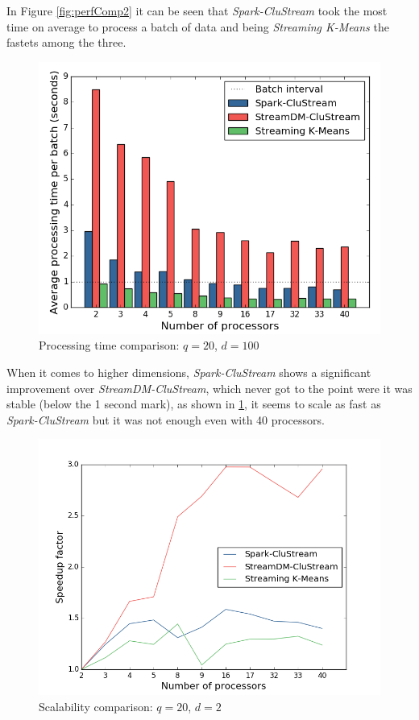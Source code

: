 In Figure \ref{fig:perfComp2} it can be seen that \textit{Spark-CluStream} took the most time on average to process a batch of data and being \textit{Streaming K-Means} the fastets among the three. 

\begin{figure}[h!]
 \centering
 \includegraphics[scale=0.45]{./styles/perfComp100.png}
 \caption{Processing time comparison: $q=20$, $d=100$}
 \label{fig:perfComp100}
\end{figure}

When it comes to higher dimensions, \textit{Spark-CluStream} shows a significant improvement over \textit{StreamDM-CluStream}, which never got to the point were it was stable (below the 1 second mark), as shown in \ref{fig:perfComp100}, it seems to scale as fast as \textit{Spark-CluStream} but it was not enough even with 40 processors. 


\begin{figure}[h!]
 \centering
 \includegraphics[scale=0.45]{./styles/scalComp2.png}
 \caption{Scalability comparison: $q=20$, $d=2$}
 \label{fig:scalComp2}
\end{figure}

